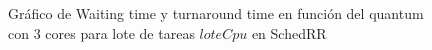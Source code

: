 \begin{figure}[H]
\hfill
{}
\hfill
{}
\hfill
\caption{Gráfico de Waiting time y turnaround time en función del quantum con 3 cores para lote de tareas $loteCpu$ en SchedRR}
\end{figure}

